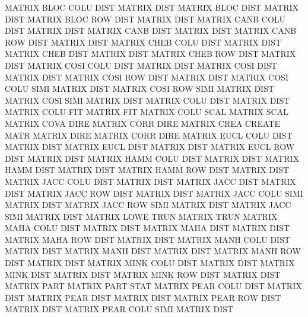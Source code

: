 MATRIX   BLOC COLU DIST                 MATRIX   DIST
MATRIX   BLOC DIST                      MATRIX   DIST
MATRIX   BLOC ROW  DIST                 MATRIX   DIST
MATRIX   CANB COLU DIST                 MATRIX   DIST
MATRIX   CANB DIST                      MATRIX   DIST
MATRIX   CANB ROW  DIST                 MATRIX   DIST
MATRIX   CHEB COLU DIST                 MATRIX   DIST
MATRIX   CHEB DIST                      MATRIX   DIST
MATRIX   CHEB ROW  DIST                 MATRIX   DIST
MATRIX   COSI COLU DIST                 MATRIX   DIST
MATRIX   COSI DIST                      MATRIX   DIST
MATRIX   COSI ROW  DIST                 MATRIX   DIST
MATRIX   COSI COLU SIMI                 MATRIX   DIST
MATRIX   COSI ROW  SIMI                 MATRIX   DIST
MATRIX   COSI SIMI                      MATRIX   DIST
MATRIX   COLU DIST                      MATRIX   DIST
MATRIX   COLU FIT                       MATRIX   FIT
MATRIX   COLU SCAL                      MATRIX   SCAL
MATRIX   COVA DIRE                      MATRIX   CORR DIRE
MATRIX   CREA                           CREATE   MATR
MATRIX   DIRE                           MATRIX   CORR DIRE
MATRIX   EUCL COLU DIST                 MATRIX   DIST
MATRIX   EUCL DIST                      MATRIX   DIST
MATRIX   EUCL ROW  DIST                 MATRIX   DIST
MATRIX   HAMM COLU DIST                 MATRIX   DIST
MATRIX   HAMM DIST                      MATRIX   DIST
MATRIX   HAMM ROW  DIST                 MATRIX   DIST
MATRIX   JACC COLU DIST                 MATRIX   DIST
MATRIX   JACC DIST                      MATRIX   DIST
MATRIX   JACC ROW  DIST                 MATRIX   DIST
MATRIX   JACC COLU SIMI                 MATRIX   DIST
MATRIX   JACC ROW  SIMI                 MATRIX   DIST
MATRIX   JACC SIMI                      MATRIX   DIST
MATRIX   LOWE TRUN                      MATRIX   TRUN
MATRIX   MAHA COLU DIST                 MATRIX   DIST
MATRIX   MAHA DIST                      MATRIX   DIST
MATRIX   MAHA ROW  DIST                 MATRIX   DIST
MATRIX   MANH COLU DIST                 MATRIX   DIST
MATRIX   MANH DIST                      MATRIX   DIST
MATRIX   MANH ROW  DIST                 MATRIX   DIST
MATRIX   MINK COLU DIST                 MATRIX   DIST
MATRIX   MINK DIST                      MATRIX   DIST
MATRIX   MINK ROW  DIST                 MATRIX   DIST
MATRIX   PART                           MATRIX   PART STAT
MATRIX   PEAR COLU DIST                 MATRIX   DIST
MATRIX   PEAR DIST                      MATRIX   DIST
MATRIX   PEAR ROW  DIST                 MATRIX   DIST
MATRIX   PEAR COLU SIMI                 MATRIX   DIST
